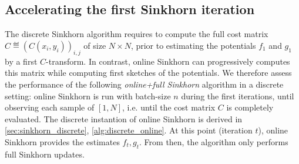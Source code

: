     



\subsection{Accelerating the first Sinkhorn iteration}\label{sec:accelerating}

The discrete Sinkhorn algorithm requires to compute the full cost matrix $\hat C \eqdef
(C(x_i,y_i))_{i,j}$  of size $N \times N$, prior to estimating the
potentials $f_1$ and $g_1$ by a first $C$-transform. In contrast, online Sinkhorn can progressively
computes this matrix while computing first sketches of the potentials. We therefore
assess the performance of the following \textit{online+full Sinkhorn} algorithm
in a discrete setting: online Sinkhorn is run with batch-size $n$ during the first iterations, until
observing each sample of $[1,N]$, i.e. until the cost matrix $C$ is completely evaluated. The discrete instantion of online Sinkhorn is derived in \autoref{sec:sinkhorn_discrete}, \autoref{alg:discrete_online}. 
At this point (iteration $t$), online Sinkhorn provides the estimates $f_{t},
g_{t}$. From then, the algorithm only performs full Sinkhorn updates.


